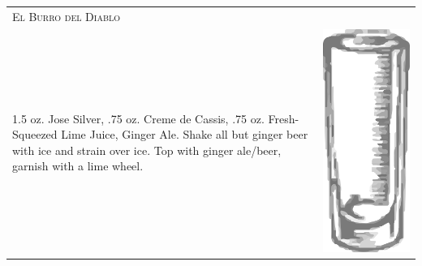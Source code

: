 \documentclass{article}
\begin{document}
\begin{tabular}{p{2in} p{0.5in}}
  \multicolumn{2}{p{3in}}{\centering\Huge\textsc{El Burro del Diablo}} \\ 
  
   \vspace{-0.1in}1.5 oz. Jose Silver, .75 oz. Creme de Cassis, .75
    oz. Fresh-Squeezed Lime Juice, Ginger Ale. Shake all but ginger beer
    with ice and strain over ice. Top with ginger ale/beer, garnish
    with a lime wheel. &  \vspace{-0.1in} \includegraphics{collins.png}
\end{tabular}
\end{document}
